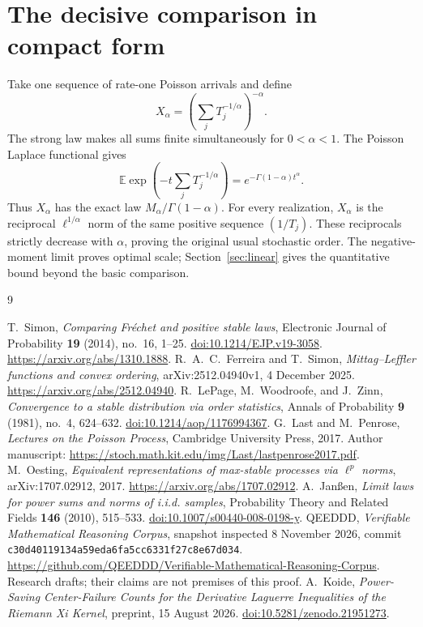 \documentclass[11pt,a4paper]{article}
\begin{document}
\section{The decisive comparison in compact form}
Take one sequence of rate-one Poisson arrivals and define
\[
X_\alpha=\left(\sum_jT_j^{-1/\alpha}\right)^{-\alpha}.
\]
The strong law makes all sums finite simultaneously for
\(0<\alpha<1\). The Poisson Laplace functional gives
\[
\mathbb E\exp\left(-t\sum_jT_j^{-1/\alpha}\right)
=e^{-\Gamma(1-\alpha)t^\alpha}.
\]
Thus \(X_\alpha\) has the exact law
\(M_\alpha/\Gamma(1-\alpha)\). For every realization,
\(X_\alpha\) is the reciprocal \(\ell^{1/\alpha}\) norm of
the same positive sequence \((1/T_j)\). These reciprocals
strictly decrease with \(\alpha\), proving the original
usual stochastic order. The negative-moment limit proves
optimal scale; Section~\ref{sec:linear} gives the quantitative
bound beyond the basic comparison.

\begin{thebibliography}{9}
\raggedright
{}
T.~Simon, \emph{Comparing Fr\'echet and positive stable laws},
Electronic Journal of Probability \textbf{19} (2014), no.~16, 1--25.
\href{https://doi.org/10.1214/EJP.v19-3058}{doi:10.1214/EJP.v19-3058}.
\url{https://arxiv.org/abs/1310.1888}.
R.~A.~C.~Ferreira and T.~Simon,
\emph{Mittag--Leffler functions and convex ordering},
arXiv:2512.04940v1, 4 December 2025.
\url{https://arxiv.org/abs/2512.04940}.
R.~LePage, M.~Woodroofe, and J.~Zinn,
\emph{Convergence to a stable distribution via order statistics},
Annals of Probability \textbf{9} (1981), no.~4, 624--632.
\href{https://doi.org/10.1214/aop/1176994367}{doi:10.1214/aop/1176994367}.
G.~Last and M.~Penrose, \emph{Lectures on the Poisson Process},
Cambridge University Press, 2017. Author manuscript:
\url{https://stoch.math.kit.edu/img/Last/lastpenrose2017.pdf}.
M.~Oesting, \emph{Equivalent representations of max-stable
processes via \(\ell^p\) norms}, arXiv:1707.02912, 2017.
\url{https://arxiv.org/abs/1707.02912}.
A.~Jan\ss en, \emph{Limit laws for power sums and norms of i.i.d. samples},
Probability Theory and Related Fields \textbf{146} (2010), 515--533.
\href{https://doi.org/10.1007/s00440-008-0198-y}{doi:10.1007/s00440-008-0198-y}.
QEEDDD, \emph{Verifiable Mathematical Reasoning Corpus},
snapshot inspected 8 November 2026,
commit \texttt{c30d40119134a59eda6fa5cc6331f27c8e67d034}.
\url{https://github.com/QEEDDD/Verifiable-Mathematical-Reasoning-Corpus}.
Research drafts; their claims are not premises of this proof.
A.~Koide, \emph{Power-Saving Center-Failure Counts for the
Derivative Laguerre Inequalities of the Riemann Xi Kernel},
preprint, 15 August 2026.
\href{https://doi.org/10.5281/zenodo.21951273}{doi:10.5281/zenodo.21951273}.
\end{thebibliography}
\end{document}

